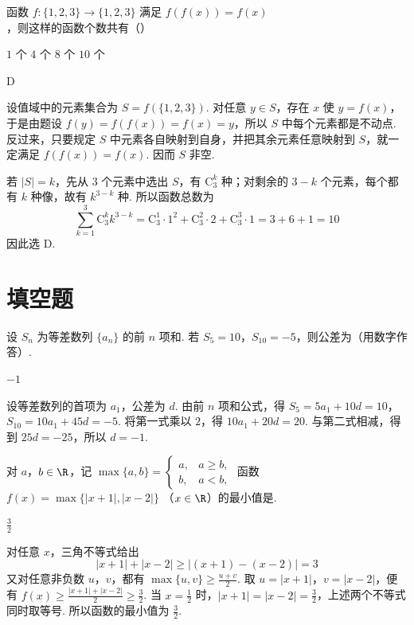 \begin{problem}
函数 \( f: \{1, 2, 3\} \to \{1, 2, 3\} \) 满足 \( f(f(x)) = f(x) \)，则这样的函数个数共有（\quad）

\choices
    {\(1\) 个}
    {\(4\) 个}
    {\(8\) 个}
    {\(10\) 个}

\begin{answer}
D
\end{answer}

\begin{solution}
设值域中的元素集合为 \(S=f(\{1,2,3\})\). 对任意 \(y\in S\)，存在 \(x\) 使 \(y=f(x)\)，于是由题设 \(f(y)=f(f(x))=f(x)=y\)，所以 \(S\) 中每个元素都是不动点. 反过来，只要规定 \(S\) 中元素各自映射到自身，并把其余元素任意映射到 \(S\)，就一定满足 \(f(f(x))=f(x)\). 因而 \(S\) 非空.

若 \(|S|=k\)，先从 3 个元素中选出 \(S\)，有 \(\mathrm C_3^k\) 种；对剩余的 \(3-k\) 个元素，每个都有 \(k\) 种像，故有 \(k^{3-k}\) 种. 所以函数总数为
\[
\sum_{k=1}^{3}\mathrm C_3^k k^{3-k}=\mathrm C_3^1\cdot1^2+\mathrm C_3^2\cdot2+\mathrm C_3^3\cdot1=3+6+1=10
\]
因此选 D.
\end{solution}
\end{problem}

\section{填空题}
\begin{problem}
设 \(S_{n}\) 为等差数列 \(\{a_{n}\}\) 的前 \(n\) 项和. 若 \(S_{5} = 10\)，\(S_{10} = -5\)，则公差为\fillinblank{}（用数字作答）.

\begin{answer}
\(-1\)
\end{answer}

\begin{solution}
设等差数列的首项为 \(a_1\)，公差为 \(d\). 由前 \(n\) 项和公式，得 \(S_5=5a_1+10d=10\)，\(S_{10}=10a_1+45d=-5\).
将第一式乘以 \(2\)，得 \(10a_1+20d=20\). 与第二式相减，得到 \(25d=-25\)，所以 \(d=-1\).
\end{solution}
\end{problem}

\begin{problem}
对 \(a\)，\(b \in \R\)，记 \(\max \{a, b\} = \begin{cases}
a, & a \geqslant b,\\
b, & a < b,
\end{cases}\) 函数 \(f(x) = \max \{|x + 1|, |x - 2|\}\) （\(x \in \R\)）的最小值是\fillinblank{}.

\begin{answer}
\(\frac{3}{2}\)
\end{answer}

\begin{solution}
对任意 \(x\)，三角不等式给出
\[
|x+1|+|x-2|\geqslant |(x+1)-(x-2)|=3
\]
又对任意非负数 \(u\)，\(v\)，都有 \(\max\{u,v\}\geqslant\frac{u+v}{2}\). 取 \(u=|x+1|\)，\(v=|x-2|\)，便有 \(f(x)\geqslant\frac{|x+1|+|x-2|}{2}\geqslant\frac32\). 当 \(x=\frac12\) 时，\(|x+1|=|x-2|=\frac32\)，上述两个不等式同时取等号. 所以函数的最小值为 \(\frac32\).
\end{solution}
\end{problem}

